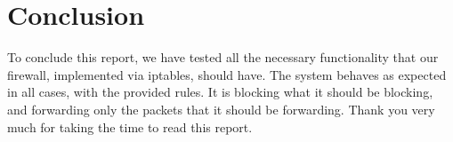 \documentclass[10pt]{article}\usepackage[]{graphicx}\usepackage[]{color}
\begin{document}
\section{Conclusion}
To conclude this report, we have tested all the necessary functionality that our firewall, implemented via iptables, should have. The system behaves as expected in all cases, with the provided rules. It is blocking what it should be blocking, and forwarding only the packets that it should be forwarding. Thank you very much for taking the time to read this report.
\end{document}
